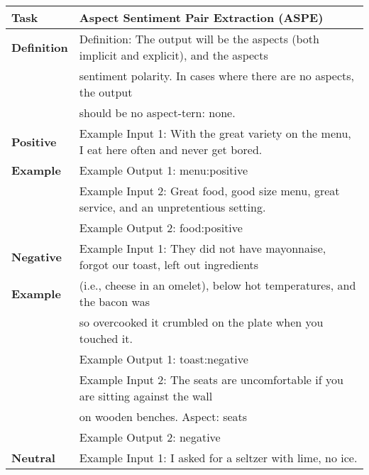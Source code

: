 \documentclass[11pt]{article}
\begin{document}
\begin{table*}[]
\begin{tabular}{ll}
\hline
\textbf{Task}             & Aspect Sentiment Pair Extraction (ASPE)                                             \\ 
\hline
\textbf{Definition} & Definition: The output will be the aspects (both implicit and explicit), and the aspects \\
                          & sentiment polarity. In cases where there are no aspects, the output \\
\textbf{}                 & should be no aspect-tern: none.                                       \\ \hline
\textbf{Positive}           & Example Input 1: With the great variety on the menu, I eat here often and never get bored.       \\
\textbf{Example}                 & Example Output 1: menu:positive                                              \\
\textbf{}           & Example Input 2: Great food, good size menu, great service, and an unpretentious setting.          \\
\textbf{}                 & Example Output 2: food:positive                                              \\ \hline
\textbf{Negative}           & Example Input 1: They did not have mayonnaise, forgot our toast,  left out ingredients            \\
\textbf{Example}           & (i.e., cheese in an omelet), below hot temperatures, and the bacon was                      \\
\textbf{}                 & so overcooked it crumbled on the plate when you touched it.       \\
\textbf{}                 & Example Output 1: toast:negative                                             \\
\textbf{}           & Example Input 2: The seats are uncomfortable if you are sitting against the wall                  \\
\textbf{}                 & on wooden benches. Aspect: seats                                   \\
\textbf{}                 & Example Output 2: negative                                                   \\ \hline
\textbf{Neutral}                 & Example Input 1: I asked for a seltzer with lime, no ice.                      \\

\end{tabular}
\end{table*}
\end{document}
